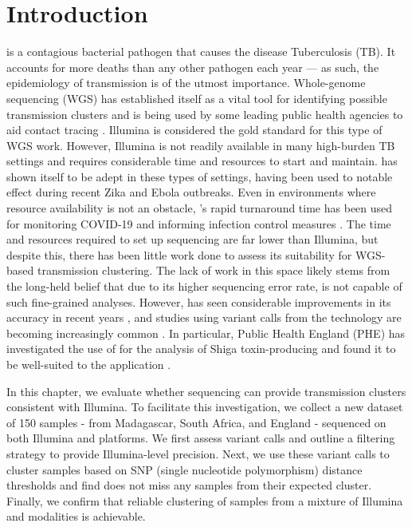 \section{Introduction}
\mtb{} is a contagious bacterial pathogen that causes the disease Tuberculosis (TB). It accounts for more deaths than any other pathogen each year \cite{who2020} — as such, the epidemiology of \mtb{} transmission is of the utmost importance. Whole-genome sequencing (WGS) has established itself as a vital tool for identifying possible transmission clusters and is being used by some leading public health agencies to aid contact tracing \cite{phe-tb-england,brooks2020}. Illumina is considered the gold standard for this type of WGS work. However, Illumina is not readily available in many high-burden TB settings and requires considerable time and resources to start and maintain. \ont{} has shown itself to be adept in these types of settings, having been used to notable effect during recent Zika \cite{faria2016} and Ebola \cite{quick2016,Hoenen2016} outbreaks. Even in environments where resource availability is not an obstacle, \ont{}'s rapid turnaround time has been used for monitoring COVID-19 and informing infection control measures \cite{meredith2020}. The time and resources required to set up \ont{} sequencing are far lower than Illumina, but despite this, there has been little work done to assess its suitability for \mtb{} WGS-based transmission clustering. The lack of work in this space likely stems from the long-held belief that due to its higher sequencing error rate, \ont{} is not capable of such fine-grained analyses. However, \ont{} has seen considerable improvements in its accuracy in recent years \cite{wick2019}, and studies using variant calls from the technology are becoming increasingly common \cite{sanderson2020,watson2020}. In particular, Public Health England (PHE) has investigated the use of \ont{} for the analysis of Shiga toxin-producing \ecoli{} and found it to be well-suited to the application \cite{greig2021}. 

In this chapter, we evaluate whether \ont{} sequencing can provide \mtb{} transmission clusters consistent with Illumina. To facilitate this investigation, we collect a new dataset of 150 samples - from Madagascar, South Africa, and England - sequenced on both Illumina and \ont{} platforms. We first assess \ont{} variant calls and outline a filtering strategy to provide Illumina-level precision. Next, we use these variant calls to cluster samples based on SNP (single nucleotide polymorphism) distance thresholds and find \ont{} does not miss any samples from their expected cluster. Finally, we confirm that reliable clustering of samples from a mixture of Illumina and \ont{} modalities is achievable.

